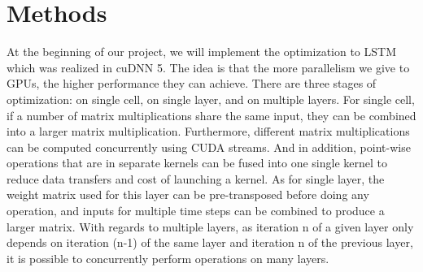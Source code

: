 \documentclass{article}
\begin{document}
\section{Methods}

At the beginning of our project, we will implement the optimization to LSTM which was realized in cuDNN 5\cite{appleyard2016optimizing}. The idea is that the more parallelism we give to GPUs, the higher performance they can achieve. There are three stages of optimization: on single cell, on single layer, and on multiple layers. For single cell, if a number of matrix multiplications share the same input, they can be combined into a larger matrix multiplication. Furthermore, different matrix multiplications can be computed concurrently using CUDA streams. And in addition, point-wise operations that are in separate kernels can be fused into one single kernel to reduce data transfers and cost of launching a kernel. As for single layer, the weight matrix used for this layer can be pre-transposed before doing any operation, and inputs for multiple time steps can be combined to produce a larger matrix. With regards to multiple layers, as iteration n of a given layer only depends on iteration (n-1) of the same layer and iteration n of the previous layer, it is possible to concurrently perform operations on many layers.

\medskip


\end{document}
